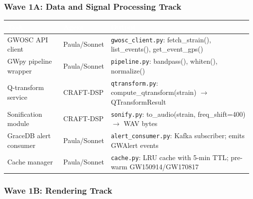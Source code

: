 \documentclass[11pt,letterpaper]{article}
\newcommand{\tableheader}[1]{\textbf{\sffamily\textcolor{white}{#1}}}
\begin{document}
\subsubsection{Wave 1A: Data and Signal Processing Track}

\begin{center}
\begin{tabularx}{\textwidth}{L{3cm}L{2cm}X}
\toprule
{}
\tableheader{Task} & \tableheader{Agent} & \tableheader{Output} \\
\midrule
GWOSC API client & Paula/Sonnet & \texttt{gwosc\_client.py}: fetch\_strain(), list\_events(), get\_event\_gps() \\
GWpy pipeline wrapper & Paula/Sonnet & \texttt{pipeline.py}: bandpass(), whiten(), normalize() \\
Q-transform service & CRAFT-DSP & \texttt{qtransform.py}: compute\_qtransform(strain) $\to$ QTransformResult \\
Sonification module & CRAFT-DSP & \texttt{sonify.py}: to\_audio(strain, freq\_shift=400) $\to$ WAV bytes \\
GraceDB alert consumer & Paula/Sonnet & \texttt{alert\_consumer.py}: Kafka subscriber; emits GWAlert events \\
Cache manager & Paula/Sonnet & \texttt{cache.py}: LRU cache with 5-min TTL; pre-warm GW150914/GW170817 \\
\bottomrule
\end{tabularx}
\end{center}

\subsubsection{Wave 1B: Rendering Track}
\end{document}
